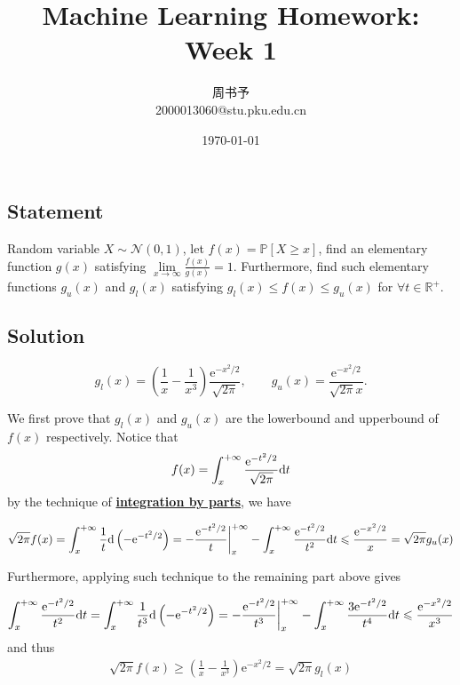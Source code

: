 \documentclass[8pt]{article}
\title{\heiti\zihao{1} Machine Learning Homework: Week 1}
\author{\kaishu\zihao{-3} 周书予\\2000013060@stu.pku.edu.cn}
\date{\today}
\theoremstyle{compact}
\def\obj#1{\textbf{\uline{#1}}}
\def\le{\leqslant}
\def\ge{\geqslant}
\def\P#1{\mathbb{P}\left[{#1}\right]}
\def\e{\mathrm{e}}
\begin{document}
\pagestyle{fancy}


\maketitle

\section{}
\subsection*{Statement}

	Random variable $X \sim \mathcal N(0, 1)$, let $f(x) = \P{X \ge x}$, find an elementary function $g(x)$ satisfying $\lim\limits_{x \to \infty} \frac{f(x)}{g(x)} = 1$. Furthermore, find such elementary functions $g_{u}(x)$ and $g_{l}(x)$ satisfying $g_l(x) \le f(x) \le g_u(x)$ for $\forall t \in \mathbb R^+$.

\subsection*{Solution}

	$$g_l(x) = \left( \frac{1}{x} - \frac{1}{x^3} \right)\frac{\e^{-x^2/2}}{\sqrt{2\pi}}, \qquad g_u(x) = \frac{\e^{-x^2/2}}{\sqrt{2\pi}x}.$$

	We first prove that $g_l(x)$ and $g_u(x)$ are the lowerbound and upperbound of $f(x)$ respectively. Notice that $$f(x) = \int_{x}^{+\infty}\frac{\e^{-t^2/2}}{\sqrt{2\pi}}\text dt$$ by the technique of \obj{integration by parts}, we have

	\begin{align}
		\sqrt{2\pi}f(x) = \int_{x}^{+\infty} \frac{1}{t} \text d\left( -\e^{-t^2/2} \right) = -\frac{\e^{-t^2/2}}{t}\bigg|_{x}^{+\infty} - \int_{x}^{+\infty}\frac{\e^{-t^2/2}}{t^2}\text dt \le \frac{\e^{-x^2/2}}{x} = \sqrt{2\pi} g_u(x)
	\end{align}

	Furthermore, applying such technique to the remaining part above gives

	\begin{align}
		\int_{x}^{+\infty}\frac{\e^{-t^2/2}}{t^2}\text dt = \int_x^{+\infty}\frac{1}{t^3}\text d \left( -\e^{-t^2/2} \right) = -\frac{\e^{-t^2/2}}{t^3}\bigg|_{x}^{+\infty} - \int_{x}^{+\infty}\frac{3\e^{-t^2/2}}{t^4}\text dt \le \frac{\e^{-x^2/2}}{x^3}
	\end{align}
	and thus
	\begin{align}
		\sqrt{2\pi}f(x) \ge \left( \frac{1}{x} - \frac{1}{x^3} \right)\e^{-x^2/2} = \sqrt{2\pi} g_l(x)
	\end{align}
	
\end{document}
